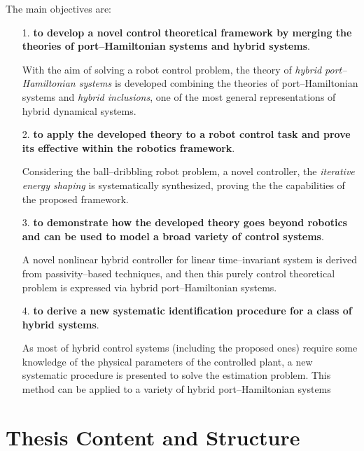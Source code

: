 The main objectives are:
%
\begin{itemize}
    \item [1.] \textbf{to develop a novel control theoretical framework by merging the theories of port--Hamiltonian systems and hybrid systems}.
    
    With the aim of solving a robot control problem, the theory of \textit{hybrid port--Hamiltonian systems} is developed combining the theories of port--Hamiltonian systems and \textit{hybrid inclusions}, one of the most general representations of hybrid dynamical systems.
    \newline
    \item [2.] \textbf{to apply the developed theory to a robot control task and prove its effective within the robotics framework}. 
    
    Considering the ball--dribbling robot problem, a novel controller, the \textit{iterative energy shaping} is systematically synthesized, proving the the capabilities of the proposed framework.
    \newline
    \item [3.] \textbf{to demonstrate how the developed theory goes beyond robotics and can be used to model a broad variety of control systems}. 
    
    A novel nonlinear hybrid controller for linear time--invariant system is derived from passivity--based techniques, and then this purely control theoretical problem is expressed via hybrid port--Hamiltonian systems.
    \newline
    \item[4.] \textbf{to derive a new systematic identification procedure for a class of hybrid systems}.
    
    As most of hybrid control systems (including the proposed ones) require some knowledge of the physical parameters of the controlled plant, a new systematic procedure is presented to solve the estimation problem. This method can be applied to a variety of hybrid port--Hamiltonian systems 
    
    \end{itemize}
%





%
\clearpage

\section{Thesis Content and Structure}
